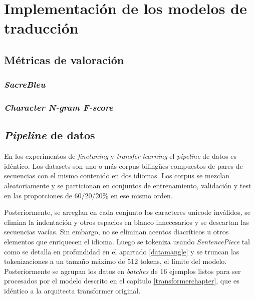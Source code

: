 \chapter{Implementación de los modelos de traducción}

\section{Métricas de valoración}
\subsection{\textit{SacreBleu}}
\cite{Post2018Oct}
\subsection{\textit{Character N-gram F-score}}
\cite{popovic-2015-chrf}


\section{\textit{Pipeline} de datos}\label{datapipeline}
En los experimentos de \textit{finetuning} y \textit{transfer learning} el \textit{pipeline} de datos es idéntico. Los datasets son uno o más corpus biling{\"u}es compuestos de pares de secuencias con el mismo contenido en dos idiomas. Los corpus se mezclan aleatoriamente y se particionan en conjuntos de entrenamiento, validación y test en las proporciones de 60/20/20\% en ese mismo orden.

Posteriormente, se arreglan en cada conjunto los caracteres unicode inválidos, se elimina la indentación y otros espacios en blanco innecesarios y se descartan las secuencias vacías. Sin embargo, no se eliminan acentos diacríticos u otros elementos que enriquecen el idioma. Luego se tokeniza usando \textit{SentencePiece} tal como se detalla en profundidad en el apartado \ref{datamangle} y se truncan las tokenizaciones a un tamaño máximo de 512 tokens, el límite del modelo. Posteriormente se agrupan los datos en \textit{batches} de 16 ejemplos listos para ser procesados por el modelo descrito en el capítulo \ref{transformerchapter}, que es idéntico a la arquitecta transformer original.

